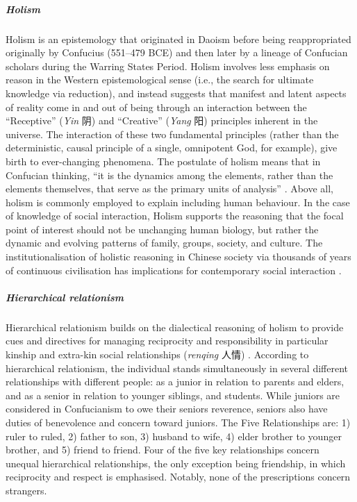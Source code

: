 \begin{CJK}{UTF8}{gbsn}
  \subparagraph{Holism}
  Holism is an epistemology that originated in Daoism before being reappropriated originally by Confucius (551–479 BCE) and then later by a lineage of Confucian scholars during the Warring States Period.  Holism involves less emphasis on reason in the Western epistemological sense (i.e., the search for ultimate knowledge via reduction), and instead suggests that manifest and latent aspects of reality come in and out of being through an interaction between the ``Receptive'' (\textit{Yin} 阴) and ``Creative'' (\textit{Yang} 阳) principles inherent in the universe.  The interaction of these two fundamental principles (rather than the deterministic, causal principle of a single, omnipotent God, for example), give birth to ever-changing phenomena.  The postulate of holism means that in Confucian thinking, ``it is the dynamics among the elements, rather than the elements themselves, that serve as the primary units of analysis'' \citep[156]{Ji2010}. Above all, holism is commonly employed to explain including human behaviour. In the case of knowledge of social interaction, Holism supports the reasoning that the focal point of interest should not be unchanging human biology, but rather the dynamic and evolving patterns of family, groups, society, and culture.  The institutionalisation of holistic reasoning in Chinese society via thousands of years of continuous civilisation has implications for contemporary social interaction \cite{Nisbett2003}.

  \subparagraph{Hierarchical relationism}
  Hierarchical relationism builds on the dialectical reasoning of holism to provide cues and directives for managing reciprocity and responsibility in particular kinship and extra-kin social relationships (\textit{renqing} 人情) \citep{Maehr1980}.  According to hierarchical relationism, the individual stands simultaneously in several different relationships with different people: as a junior in relation to parents and elders, and as a senior in relation to younger siblings, and students. While juniors are considered in Confucianism to owe their seniors reverence, seniors also have duties of benevolence and concern toward juniors. The Five Relationships are: 1) ruler to ruled, 2) father to son, 3) husband to wife, 4) elder brother to younger brother, and 5) friend to friend. Four of the five key relationships concern unequal hierarchical relationships, the only exception being friendship, in which reciprocity and respect is emphasised.  Notably, none of the prescriptions concern strangers.


\end{CJK}
